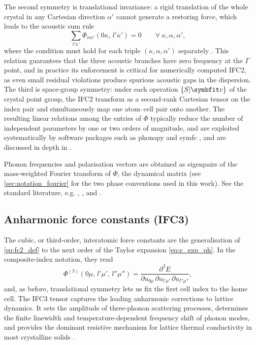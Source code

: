 The second symmetry is translational invariance: a rigid translation of
the whole crystal in any Cartesian direction $\alpha'$ cannot generate
a restoring force, which leads to the acoustic sum rule
\begin{equation}\label{eq:fc2_asr}
  \sum_{l'\kappa'} \Phi_{\alpha\alpha'}(0\kappa,\,l'\kappa') = 0
  \qquad \forall\;\kappa,\alpha,\alpha',
\end{equation}
where the condition must hold for each triple
$(\kappa,\alpha,\alpha')$ separately \cite{born_dynamical_1996, pick_microscopic_1970, gonze_dynamical_1997}.
This relation guarantees that the three
acoustic branches have zero frequency at the $\Gamma$
point, and in practice its enforcement is critical for numerically
computed IFC2, as even small residual violations produce spurious
acoustic gaps in the dispersion.  The third is space-group
symmetry: under each operation $\{S|\vc{v}\}$ of the crystal point
group, the IFC2 transform as a second-rank Cartesian tensor on the
index pair and simultaneously map one atom--cell pair onto another.
The resulting linear relations among the entries of $\Phi$
typically reduce the number of independent parameters by one or two
orders of magnitude, and are exploited systematically by software
packages such as phonopy \cite{togo_first_2015} and symfc
\cite{seko_projector-based_2024}, and are discussed in depth in \citet{fu_group_2019}.

Phonon frequencies and polarisation vectors are obtained as
eigenpairs of the mass-weighted Fourier transform of $\Phi$, the
dynamical matrix (see \cref{sec:notation_fourier} for the two phase
conventions used in this work).  See the standard literature, e.g.
\citet{born_dynamical_1996}, \citet{maradudin_theory_1963}, and
\citet{dove_introduction_1993}.

\subsection{Anharmonic force constants (IFC3)}
\label{sub:fc3}

The cubic, or third-order, interatomic force constants are the
generalisation of \cref{eq:fc2_def} to the next order of the
Taylor expansion \cref{eq:e_exp_ph}.  In the composite-index
notation, they read
\begin{equation}\label{eq:fc3_def}
  \Phi^{(3)}(0\mu,\,l'\mu',\,l''\mu'')
  = \frac{\partial^3 E}
         {\partial u_{0\mu}\,
          \partial u_{l'\mu'}\,
          \partial u_{l''\mu''}},
\end{equation}
and, as before, translational symmetry lets us fix the first cell
index to the home cell.  The IFC3 tensor captures the leading
anharmonic corrections to lattice dynamics.  It sets the amplitude
of three-phonon scattering processes, determines the finite
linewidth and temperature-dependent frequency shift of phonon modes,
and provides the dominant resistive mechanism for lattice thermal
conductivity in most crystalline solids \cite{ziman_electrons_2001, srivastava_physics_2019}.

